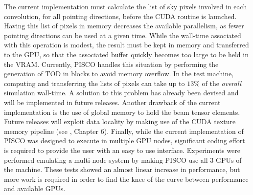 \documentclass[a4paper,11pt]{article}
\begin{document}
The current implementation must calculate the list of sky pixels involved in each convolution, for all pointing directions, before the CUDA routine is launched. Having this list of pixels in memory decreases the available parallelism, as fewer pointing directions can be used at a given time. While the wall-time associated with this operation is modest, the result must be kept in memory and transferred to the GPU, so that the associated buffer quickly becomes too large to be held in the VRAM. Currently, PISCO handles this situation by performing the generation of TOD in blocks to avoid memory overflow. In the test machine, computing and transferring the lists of pixels can take up to $13\%$ of the \textsl{overall} simulation wall-time. A solution to this problem has already been devised and will be implemented in future releases. Another drawback of the current implementation is the use of global memory to hold the beam tensor elements. Future releases will exploit data locality by making use of the CUDA texture memory pipeline (see \cite{sanders2010cuda}, Chapter 6). Finally, while the current implementation of PISCO was designed to execute in multiple GPU nodes, significant coding effort is required to provide the user with an easy to use interface. Experiments were performed emulating a multi-node system by making PISCO use all 3 GPUs of the machine. These tests showed an almost linear increase in performance, but more work is required in order to find the knee of the curve between performance and available GPUs.


\end{document}
